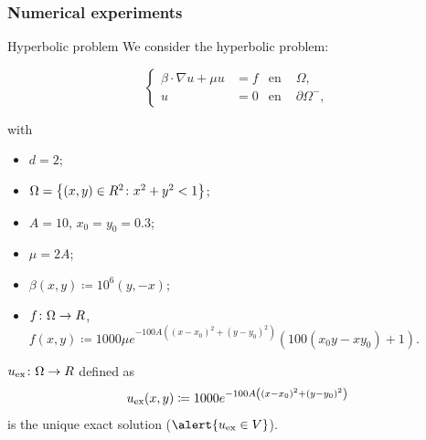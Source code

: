 \subsubsection{Numerical experiments}

\begin{frame}{Hyperbolic problem}
	\scriptsize
	We consider the hyperbolic problem:
	\begin{block}{}
	\begin{equation*}
	\left\{
	\begin{aligned}
	\beta\cdot\nabla u+\mu u&=f & \text{en } &\Omega, \\
	u&=0 & \text{en } &\partial\Omega^-,
	\end{aligned}
	\right.
	\end{equation*}
	\end{block}
	with
	\begin{itemize}
		\item $d=2$;
		\item $\Omega=\left\{(x,y)\in\relax R^2\colon x^2+y^2<1 \right\}$;
		\item $A=10$, $x_0=y_0=0.3$;
		\item $\mu=2A$;
		\item $\beta(x,y)\coloneqq10^6(y,-x)$;
		\item $f\colon\Omega\to\relax R$, $f(x,y)\coloneqq 1000\mu e^{-100A\left((x-x_0)^2+(y-y_0)^2\right)}(100(x_0 y -x y_0) + 1)$.
	\end{itemize}
	
	\vspace*{0.3cm}
	$u_{\text{ex}}\colon\Omega\to\relax R$ defined as
	\begin{equation*}
	u_{\text{ex}} (x,y)\coloneqq 1000e^{-100A\left((x-x_0)^2+(y-y_0)^2\right)}
	\end{equation*}
	is the \alert{unique exact solution} ($\alert{u_\text{ex}\in V}$).
	
	\end{frame}

